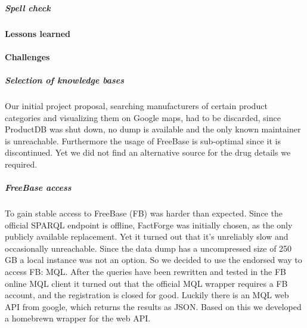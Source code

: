 \documentclass[11pt,titlepage,oneside,openany]{book}
\begin{document}
\subparagraph{Spell check}
\label{sec:drug_spellcheck}

\paragraph{Lessons learned}
\label{cha:lessons}




\paragraph{Challenges}
\label{sec:challenges}

\subparagraph{Selection of knowledge bases} Our initial project proposal, searching manufacturers of certain product categories and visualizing them on Google maps, had to be discarded, since ProductDB was shut down, no dump is available and the only known maintainer is unreachable. Furthermore the usage of FreeBase is sub-optimal since it is discontinued. Yet we did not find an alternative source for the drug details we required. 


\subparagraph{FreeBase access}
\label{sec:challenges}
To gain stable access to FreeBase (FB) was harder than expected. Since the official SPARQL endpoint is offline, FactForge was initially chosen, as the only publicly available replacement. Yet it turned out that it's unreliably slow and occasionally unreachable. Since the data dump has a uncompressed size of 250 GB a local instance was not an option. 
So we decided to use the endorsed way to access FB: MQL. After the queries have been rewritten and tested in the FB online MQL client it turned out that the official MQL wrapper requires a FB account, and the registration is closed for good.
Luckily there is an MQL web API from google, which returns the results as JSON. Based on this we developed a homebrewn wrapper for the web API.


\appendix

\newpage
\end{document}
